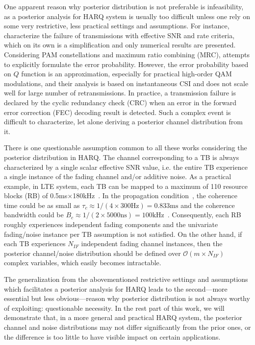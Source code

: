 \documentclass[journal,draftcls,onecolumn,12pt,twoside]{IEEEtran}
\begin{document}
One apparent reason why posterior distribution is not preferable is
infeasibility, as a posterior analysis for HARQ system is usually too difficult
unless one rely on some very restrictive, less practical settings and assumptions. For instance, \cite{gu2006modeling} characterize the failure of
transmissions with effective SNR and rate criteria, which on its own is a
simplification and only numerical results are presented. Considering PAM
constellations and maximum ratio combining (MRC),
\cite{long2012analysis}\cite{alkurd2015modeling} attempts to explicitly
formulate the error probability. However, the error probability based on $Q$
function is an approximation, especially for practical high-order QAM
modulations, and their analysis is based on instantaneous CSI and does not scale
well for large number of retransmissions. In practice, a transmission failure is
declared by the cyclic redundancy check (CRC) when an error in the forward error
correction (FEC) decoding result is detected. Such a complex event is difficult
to characterize, let alone deriving a posterior channel distribution from it.

There is one questionable assumption common to all these works considering the
posterior distribution in HARQ.
The channel corresponding to a TB is always characterized by a single scalar
effective SNR value, i.e. the entire TB experience a single instance of the
fading channel and/or additive noise. As a practical example, in LTE system,
each TB can be mapped to a maximum of 110 resource blocks (RB) of
0.5ms$\times$180kHz~\cite[Table 7.1.7.2.1-1]{ts36.213}.
In the propagation condition~\cite[Table B.2-3]{ts36.141}, the coherence time
could be as small as $\tau_c\approx 1 / (4 \times 300\mbox{Hz}) =
0.833\mbox{ms}$ and the coherence bandwidth could be $B_c\approx 1 / (2 \times
5000\mbox{ns}) = 100\mbox{kHz}$~\cite[Table 2.1]{tse2005fundamentals}.
Consequently, each RB roughly experiences independent fading components and the
univariate fading/noise instance per TB assumption is not satisfied. On the
other hand, if each TB experiences $N_{IF}$ independent fading channel
instances, then the posterior channel/noise distribution should be defined over
$\mathcal{O}(m\times N_{IF})$ complex variables, which easily becomes
intractable.

The generalization from the abovementioned restrictive settings and assumptions 
which facilitates a posterior analysis for HARQ leads to the
second---more essential but less obvious---reason why posterior distribution is
not always worthy of exploiting: questionable necessity. In the rest part of
this work, we will demonstrate that, in a more general and practical HARQ system, the
posterior channel and noise distributions may not differ significantly from the
prior ones, or the difference is too little to have visible
impact on certain applications.
\end{document}

